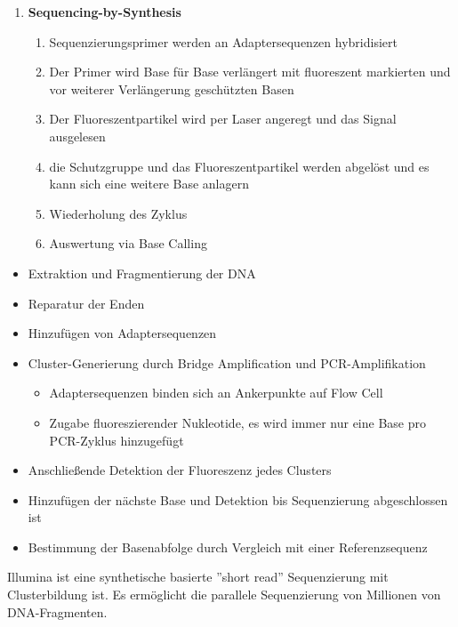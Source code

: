 \begin{enumerate}
\begin{enumerate}
        \item Denaturierung und Wiederholung
        \item Der Gegenstrang wird abgeschnitten und verworfen 
        \item Frei 3'-Enden werden blockiert
    \end{enumerate}
    \item \textbf{Sequencing-by-Synthesis}
    \begin{enumerate}
     \item Sequenzierungsprimer werden an Adaptersequenzen hybridisiert 
        \item Der Primer wird Base für Base verlängert mit fluoreszent markierten und vor weiterer Verlängerung geschützten Basen 
        \item Der Fluoreszentpartikel wird per Laser angeregt und das Signal ausgelesen 
        \item die Schutzgruppe und das Fluoreszentpartikel werden abgelöst und es kann sich eine weitere Base anlagern 
        \item Wiederholung des Zyklus
        \item Auswertung via Base Calling 
    \end{enumerate}
\end{enumerate}



\begin{mechanism}[title=Erklären Sie Illumina Sequencing]
\begin{itemize}
    \item Extraktion und Fragmentierung der DNA
    \item Reparatur der Enden
    \item Hinzufügen von Adaptersequenzen
    \item Cluster-Generierung durch Bridge Amplification und PCR-Amplifikation
    \begin{itemize}
        \item Adaptersequenzen binden sich an Ankerpunkte auf \gls{Flow Cell}
        \item Zugabe fluoreszierender Nukleotide, es wird immer nur eine Base pro PCR-Zyklus hinzugefügt
    \end{itemize}
    \item Anschließende Detektion der Fluoreszenz jedes Clusters
    \item Hinzufügen der nächste Base und Detektion bis Sequenzierung abgeschlossen ist
    \item Bestimmung der Basenabfolge durch Vergleich mit einer Referenzsequenz
\end{itemize}
\end{mechanism}
\begin{mechanism}[title=Prinzip von Illumina Sequencing]
Illumina ist eine synthetische basierte ”short read” Sequenzierung mit Clusterbildung ist. Es ermöglicht die parallele Sequenzierung von Millionen von DNA-Fragmenten.
\end{mechanism}


